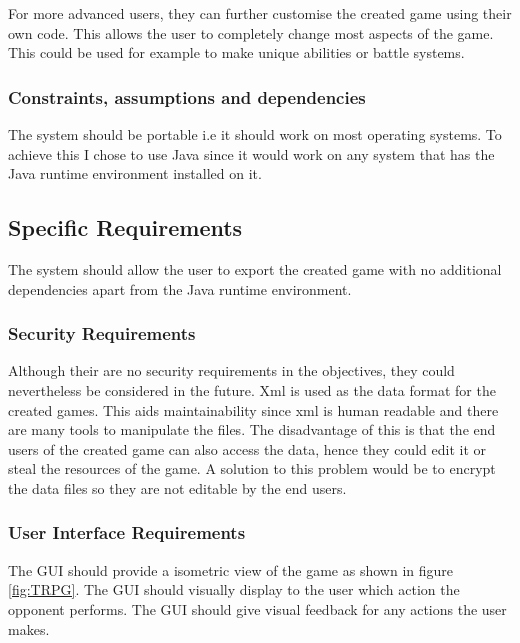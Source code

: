 For more advanced users, they can further customise the created game using their own code. This allows the user to completely change most aspects of the game. This could be used for example to make unique abilities or battle systems.


\subsubsection{Constraints, assumptions and dependencies}
The system should be portable i.e it should work on most operating systems.  To achieve this I chose to use Java  since it would work on any system that has the Java runtime environment installed on it. 



\subsection{Specific Requirements}
The system should allow the user to export the created game with no additional dependencies apart from the Java runtime environment. 

\subsubsection{Security Requirements}
Although their are no security requirements in the objectives, they could nevertheless  be considered in the future. Xml is used as the data format for the created games. This aids maintainability since xml is human readable and there are many tools to manipulate the files. The disadvantage of this is that the end users of the created game can also access the data, hence they could edit it or steal the resources of the game. A solution to this problem would be to encrypt the data files so they are not editable by the end users.    

\subsubsection{User Interface Requirements}
The GUI should provide a isometric view of the game as shown in figure \ref{fig:TRPG}. The GUI should visually display to the user  which action the opponent performs. The GUI should give visual feedback for any actions the user makes.
